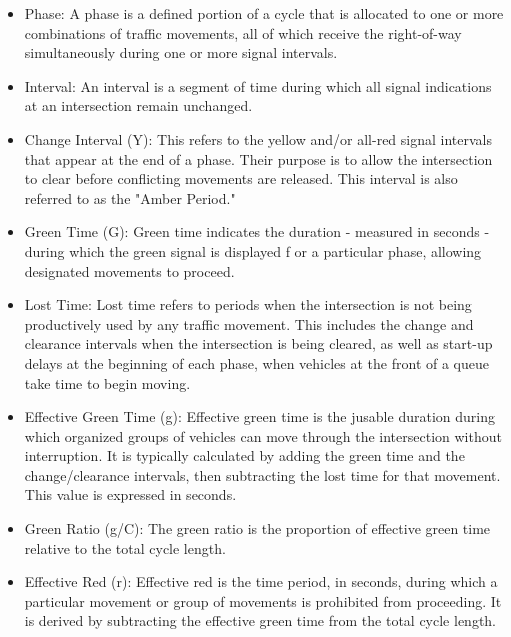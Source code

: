\begin{itemize}
    \item Phase: A phase is a defined portion of a cycle that 
    is allocated to one or more combinations of traffic movements, 
    all of which receive the right-of-way simultaneously during 
    one or more signal intervals.

    \item  Interval: An interval is a segment of time during which 
    all signal indications at an intersection remain unchanged.

    \item Change Interval (Y): This refers to the yellow and/or 
    all-red signal intervals that appear at the end of a phase. 
    Their purpose is to allow the intersection to clear before 
    conflicting movements are released. This interval is also 
    referred to as the "Amber Period."

    \item Green Time (G): Green time indicates the duration - 
    measured in seconds - during which the green signal is displayed f
    or a particular phase, allowing designated movements to proceed.

    \item Lost Time: Lost time refers to periods when the 
    intersection is not being productively used by any 
    traffic movement. This includes the change and clearance 
    intervals when the intersection is being cleared, as 
    well as start-up delays at the beginning of each phase, 
    when vehicles at the front of a queue take time to begin 
    moving.

    \item Effective Green Time (g): Effective green time is the 
    jusable duration during which organized groups of vehicles 
    can move through the intersection without interruption. 
    It is typically calculated by adding the green time and 
    the change/clearance intervals, then subtracting the lost 
    time for that movement. This value is expressed in 
    seconds.

    \item Green Ratio (g/C): The green ratio is the 
    proportion of effective green time relative to the total 
    cycle length.

    \item Effective Red (r): Effective red is the time period, 
    in seconds, during which a particular movement or group 
    of movements is prohibited from proceeding. It is derived 
    by subtracting the effective green time from the total 
    cycle length.
    
\end{itemize}


